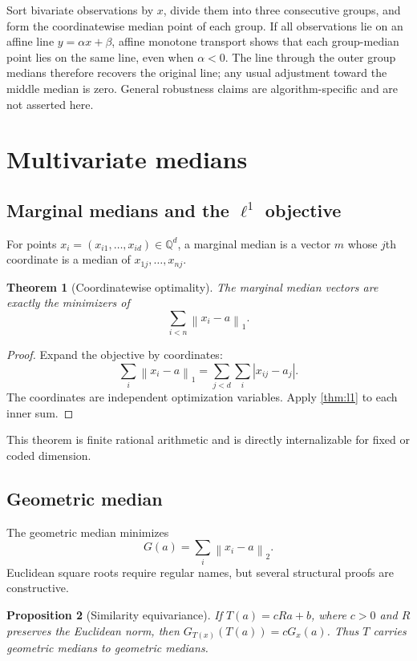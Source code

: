 \documentclass[11pt]{article}
\newtheorem{theorem}{Theorem}[section]
\newtheorem{proposition}[theorem]{Proposition}
\newcommand{\Rat}{\mathbb Q}
\newcommand{\abs}[1]{\left|#1\right|}
\newcommand{\norm}[1]{\left\lVert#1\right\rVert}
\begin{document}
Sort bivariate observations by $x$, divide them into three consecutive groups,
and form the coordinatewise median point of each group.  If all observations
lie on an affine line $y=\alpha x+\beta$, affine monotone transport shows that
each group-median point lies on the same line, even when $\alpha<0$.  The line
through the outer group medians therefore recovers the original line; any
usual adjustment toward the middle median is zero.  General robustness claims
are algorithm-specific and are not asserted here.

\section{Multivariate medians}

\subsection{Marginal medians and the $\ell^1$ objective}

For points $x_i=(x_{i1},\ldots,x_{id})\in\Rat^d$, a marginal median is a
vector $m$ whose $j$th coordinate is a median of
$x_{1j},\ldots,x_{nj}$.

\begin{theorem}[Coordinatewise optimality]\label{thm:marginal}
The marginal median vectors are exactly the minimizers of
\[
  \sum_{i<n}\norm{x_i-a}_1.
\]
\end{theorem}

\begin{proof}
Expand the objective by coordinates:
\[
 \sum_i\norm{x_i-a}_1
 =\sum_{j<d}\sum_i\abs{x_{ij}-a_j}.
\]
The coordinates are independent optimization variables.  Apply
\cref{thm:l1} to each inner sum.
\end{proof}

This theorem is finite rational arithmetic and is directly internalizable for
fixed or coded dimension.

\subsection{Geometric median}

The geometric median minimizes
\[
 G(a)=\sum_i\norm{x_i-a}_2.
\]
Euclidean square roots require regular names, but several structural proofs
are constructive.

\begin{proposition}[Similarity equivariance]
If $T(a)=cRa+b$, where $c>0$ and $R$ preserves the Euclidean norm, then
$G_{T(x)}(T(a))=cG_x(a)$.  Thus $T$ carries geometric medians to geometric
medians.
\end{proposition}
\end{document}
